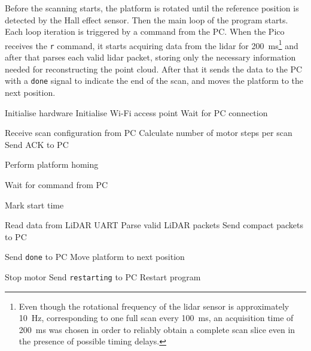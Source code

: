 Before the scanning starts, the platform is rotated until the reference position is detected by the Hall effect sensor.
Then the main loop of the program starts. Each loop iteration is triggered by a command from the PC.
When the Pico receives the \texttt{r} command, it starts acquiring data from the \gls{lidar} for \SI{200}{\milli\second}\footnote{Even though the rotational frequency of the \gls{lidar} sensor is approximately \SI{10}{\hertz}, corresponding to one full scan every \SI{100}{\milli\second}, an acquisition time of \SI{200}{\milli\second} was chosen in order to reliably obtain a complete scan slice even in the presence of possible timing delays.} and after that parses each valid \gls{lidar} packet, storing only the necessary information needed for reconstructing the point cloud. 
After that it sends the data to the PC with a \texttt{done} signal to indicate the end of the scan, and moves the platform to the next position.
\begin{algorithm}[H]
\caption{Pico program pseudocode}
\label{alg:pico-program}
\begin{algorithmic}

\State Initialise hardware
\State Initialise Wi-Fi access point
\State Wait for PC connection

\State Receive scan configuration from PC
\State Calculate number of motor steps per scan
\State Send ACK to PC

\State Perform platform homing


    \State Wait for command from PC


        \State Mark start time

            \State Read data from LiDAR UART
            \State Parse valid LiDAR packets
            \State Send compact packets to PC
        \EndWhile

        \State Send \texttt{done} to PC
        \State Move platform to next position


        \State Stop motor
        \State Send \texttt{restarting} to PC
        \State Restart program

    \EndIf
\EndWhile

\end{algorithmic}
\end{algorithm}

